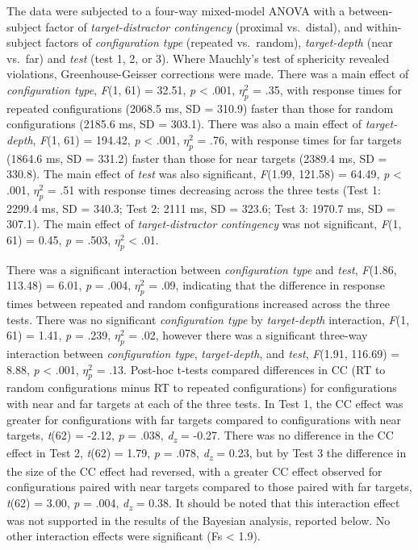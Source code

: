 \documentclass[
  man,floatsintext]{apa7}
\begin{document}
The data were subjected to a four-way mixed-model ANOVA with a between-subject factor of \emph{target-distractor contingency} (proximal vs.~distal), and within-subject factors of \emph{configuration type} (repeated vs.~random), \emph{target-depth} (near vs.~far) and \emph{test} (test 1, 2, or 3). Where Mauchly's test of sphericity revealed violations, Greenhouse-Geisser corrections were made. There was a main effect of \emph{configuration type}, \emph{F}(1, 61) = 32.51, \emph{p} \textless{} .001, \(\eta^2_p\) = .35, with response times for repeated configurations (2068.5 ms, SD = 310.9) faster than those for random configurations (2185.6 ms, SD = 303.1). There was also a main effect of \emph{target-depth}, \emph{F}(1, 61) = 194.42, \emph{p} \textless{} .001, \(\eta^2_p\) = .76, with response times for far targets (1864.6 ms, SD = 331.2) faster than those for near targets (2389.4 ms, SD = 330.8). The main effect of \emph{test} was also significant, \emph{F}(1.99, 121.58) = 64.49, \emph{p} \textless{} .001, \(\eta^2_p\) = .51 with response times decreasing across the three tests (Test 1: 2299.4 ms, SD = 340.3; Test 2: 2111 ms, SD = 323.6; Test 3: 1970.7 ms, SD = 307.1). The main effect of \emph{target-distractor contingency} was not significant, \emph{F}(1, 61) = 0.45, \emph{p} = .503, \(\eta^2_p\) \textless{} .01.

There was a significant interaction between \emph{configuration type} and \emph{test}, \emph{F}(1.86, 113.48) = 6.01, \emph{p} = .004, \(\eta^2_p\) = .09, indicating that the difference in response times between repeated and random configurations increased across the three tests. There was no significant \emph{configuration type} by \emph{target-depth} interaction, \emph{F}(1, 61) = 1.41, \emph{p} = .239, \(\eta^2_p\) = .02, however there was a significant three-way interaction between \emph{configuration type}, \emph{target-depth}, and \emph{test}, \emph{F}(1.91, 116.69) = 8.88, \emph{p} \textless{} .001, \(\eta^2_p\) = .13. Post-hoc t-tests compared differences in CC (RT to random configurations minus RT to repeated configurations) for configurations with near and far targets at each of the three tests. In Test 1, the CC effect was greater for configurations with far targets compared to configurations with near targets, \emph{t}(62) = -2.12, \emph{p} = .038, \emph{d\textsubscript{z}} = -0.27. There was no difference in the CC effect in Test 2, \emph{t}(62) = 1.79, \emph{p} = .078, \emph{d\textsubscript{z}} = 0.23, but by Test 3 the difference in the size of the CC effect had reversed, with a greater CC effect observed for configurations paired with near targets compared to those paired with far targets, \emph{t}(62) = 3.00, \emph{p} = .004, \emph{d\textsubscript{z}} = 0.38. It should be noted that this interaction effect was not supported in the results of the Bayesian analysis, reported below. No other interaction effects were significant (Fs \textless{} 1.9).
\end{document}
